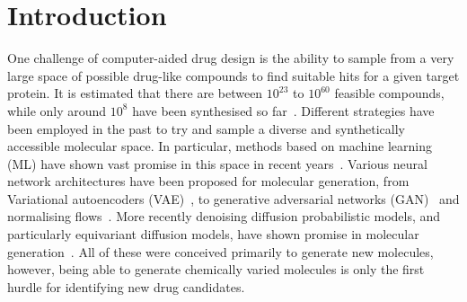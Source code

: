 \documentclass[journal=jacsat,manuscript=article]{achemso}
\begin{document}
\section{Introduction}
\label{sec:intro}
One challenge  of computer-aided drug design is the ability to sample from a very large space of possible drug-like compounds to find suitable hits for a given target protein. It is estimated that there are between $10^{23}$ to $10^{60}$ feasible compounds, while only around $10^8$ have been synthesised so far~\cite{polishchuk2013estimation, reymond2012exploring}. Different strategies have been employed in the past to try and sample a diverse and synthetically accessible molecular space. In particular, methods based on machine learning (ML) have shown vast promise in this space in recent years~\cite{bilodeau2022generative}. Various neural network architectures have been proposed for molecular generation, from Variational autoencoders (VAE)~\cite{kingma2022autoencoding, jin2018junction, ma2018constrained, agoza2022generating}, to generative adversarial networks (GAN)~\cite{hoffmann2019generating} and normalising flows~\cite{shi2021learning}. More recently denoising diffusion probabilistic models, and particularly equivariant diffusion models, have shown promise in molecular generation~\cite{xu2022geodiff, hoogeboom2022equivariant}. All of these were conceived primarily to generate new molecules, however, being able to generate chemically varied molecules is only the first hurdle for identifying new drug candidates.
\end{document}
